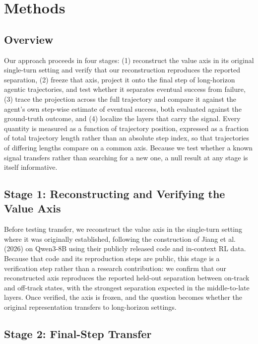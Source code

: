 \documentclass{article}
\begin{document}
\section{Methods}

\subsection{Overview}

Our approach proceeds in four stages: (1) reconstruct the value axis in its original single-turn setting and verify that our reconstruction reproduces the reported separation, (2) freeze that axis, project it onto the final step of long-horizon agentic trajectories, and test whether it separates eventual success from failure, (3) trace the projection across the full trajectory and compare it against the agent's own step-wise estimate of eventual success, both evaluated against the ground-truth outcome, and (4) localize the layers that carry the signal. Every quantity is measured as a function of trajectory position, expressed as a fraction of total trajectory length rather than an absolute step index, so that trajectories of differing lengths compare on a common axis. Because we test whether a known signal transfers rather than searching for a new one, a null result at any stage is itself informative.

\subsection{Stage 1: Reconstructing and Verifying the Value Axis}

Before testing transfer, we reconstruct the value axis in the single-turn setting where it was originally established, following the construction of Jiang et al. (2026) on Qwen3-8B using their publicly released code and in-context RL data. Because that code and its reproduction steps are public, this stage is a verification step rather than a research contribution: we confirm that our reconstructed axis reproduces the reported held-out separation between on-track and off-track states, with the strongest separation expected in the middle-to-late layers. Once verified, the axis is frozen, and the question becomes whether the original representation transfers to long-horizon settings.

\subsection{Stage 2: Final-Step Transfer}
\end{document}
